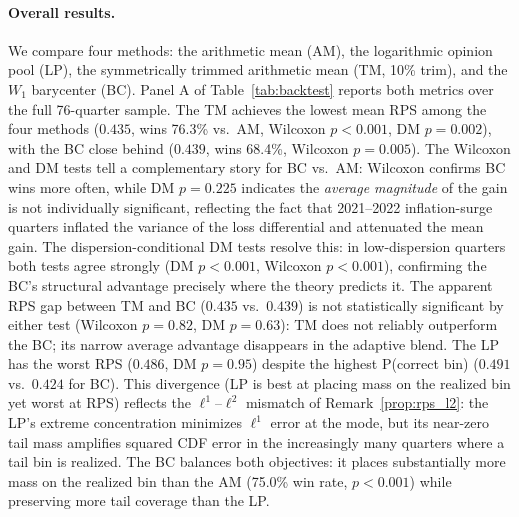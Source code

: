 \paragraph{Overall results.}  We compare four methods: the arithmetic mean (AM), the logarithmic opinion pool (LP), the symmetrically trimmed arithmetic mean (TM, 10\% trim), and the $W_1$ barycenter (BC).  Panel A of Table~\ref{tab:backtest} reports both metrics over the full 76-quarter sample.  The TM achieves the lowest mean RPS among the four methods ($0.435$, wins 76.3\% vs.\ AM, Wilcoxon $p < 0.001$, DM $p = 0.002$), with the BC close behind ($0.439$, wins 68.4\%, Wilcoxon $p = 0.005$).  The Wilcoxon and DM tests tell a complementary story for BC vs.\ AM: Wilcoxon confirms BC wins more often, while DM $p = 0.225$ indicates the \emph{average magnitude} of the gain is not individually significant, reflecting the fact that 2021--2022 inflation-surge quarters inflated the variance of the loss differential and attenuated the mean gain.  The dispersion-conditional DM tests resolve this: in low-dispersion quarters both tests agree strongly (DM $p < 0.001$, Wilcoxon $p < 0.001$), confirming the BC's structural advantage precisely where the theory predicts it.  The apparent RPS gap between TM and BC ($0.435$ vs.\ $0.439$) is not statistically significant by either test (Wilcoxon $p = 0.82$, DM $p = 0.63$): TM does not reliably outperform the BC; its narrow average advantage disappears in the adaptive blend.  The LP has the worst RPS ($0.486$, DM $p = 0.95$) despite the highest P(correct bin) ($0.491$ vs.\ $0.424$ for BC).  This divergence (LP is best at placing mass on the realized bin yet worst at RPS) reflects the $\ell^1$--$\ell^2$ mismatch of Remark~\ref{prop:rps_l2}: the LP's extreme concentration minimizes $\ell^1$ error at the mode, but its near-zero tail mass amplifies squared CDF error in the increasingly many quarters where a tail bin is realized.  The BC balances both objectives: it places substantially more mass on the realized bin than the AM (75.0\% win rate, $p < 0.001$) while preserving more tail coverage than the LP.

